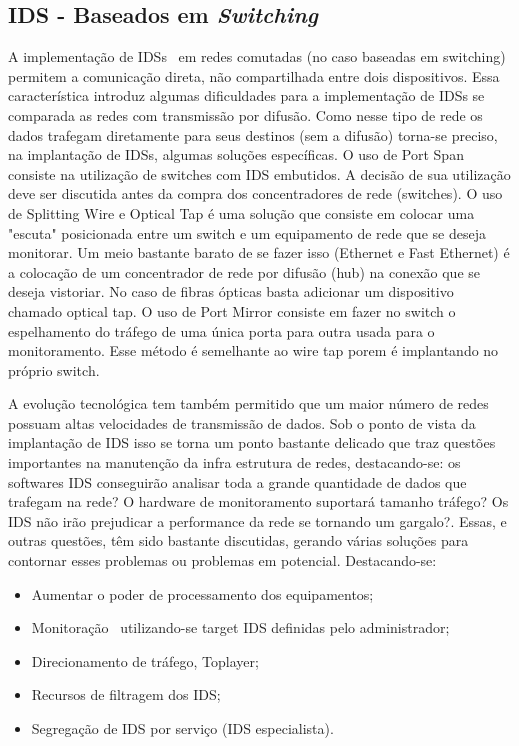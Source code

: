 \subsection{IDS - Baseados em \emph{Switching}}

A implementação de IDSs~\cite{tanenbaum} em redes comutadas (no caso baseadas em switching) permitem a comunicação direta, não compartilhada entre dois dispositivos. Essa característica introduz algumas dificuldades para a implementação de IDSs se comparada as redes com transmissão por difusão.
Como nesse tipo de rede os dados trafegam diretamente para seus destinos (sem a difusão) torna-se preciso, na implantação de IDSs, algumas soluções específicas.
O uso de Port Span consiste na utilização de switches com IDS embutidos. A decisão de sua utilização deve ser discutida antes da compra dos concentradores de rede (switches).
O uso de Splitting Wire e Optical Tap é uma solução que consiste em colocar uma "escuta" posicionada entre um switch e um equipamento de rede que se deseja monitorar. Um meio bastante barato de se fazer isso (Ethernet e Fast Ethernet) é a colocação de um concentrador de rede por difusão (hub) na conexão que se deseja vistoriar. No caso de fibras ópticas basta adicionar um dispositivo chamado optical tap.
O uso de Port Mirror consiste em fazer no switch o espelhamento do tráfego de uma única porta para outra usada para o monitoramento. Esse método é semelhante ao wire tap porem é implantando no próprio switch.

A evolução tecnológica tem também permitido que um maior número de redes possuam altas velocidades de transmissão de dados. Sob o ponto de vista da implantação de IDS isso se torna um ponto bastante delicado que traz questões importantes na manutenção da infra estrutura de redes, destacando-se: os softwares IDS conseguirão analisar toda a grande quantidade de dados que trafegam na rede? O hardware de monitoramento suportará tamanho tráfego? Os IDS não irão prejudicar a performance da rede se tornando um gargalo?.
Essas, e outras questões, têm sido bastante discutidas, gerando várias soluções para contornar esses problemas ou problemas em potencial. Destacando-se:
\begin{itemize}
	\item Aumentar o poder de processamento dos equipamentos;
	\item Monitoração~\cite{nemeth} utilizando-se target IDS definidas pelo administrador;
	\item Direcionamento de tráfego, Toplayer;
	\item Recursos de filtragem dos IDS;
    \item Segregação de IDS por serviço (IDS especialista).
\end{itemize}
